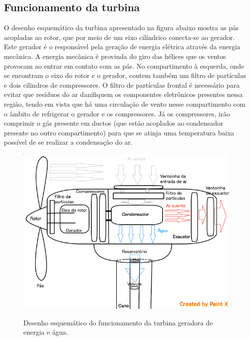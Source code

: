 \subsection{Funcionamento da turbina}
  
  O desenho esquemático da turbina apresentado na figura abaixo mostra as pás acopladas ao rotor, que por meio de um eixo cilíndrico conecta-se ao gerador. Este gerador é o responsável pela geração de energia elétrica através da energia mecânica. A energia mecânica é provinda do giro das hélices que os ventos provocam ao entrar em contato com as pás.  No compartimento à esquerda, onde se encontram o eixo do rotor e o gerador, contem também um filtro de partículas e dois cilindros de compressores. O filtro de partículas frontal é necessário para evitar que resíduos do ar danifiquem os componentes eletrônicos presentes nessa região, tendo em vista que há uma circulação de vento nesse compartimento com o âmbito de refrigerar o gerador e os compressores. Já os compressores, irão comprimir o gás presente em ductos (que estão acoplados ao condensador presente no outro compartimento) para que se atinja uma temperatura baixa possível de se realizar a condensação do ar.
  
  \FloatBarrier
  \begin{figure}[!h]
    \centering
    \includegraphics[scale = 0.9]{editaveis/figuras/funcionamento_turbina}
    \label{funcionamento_turbina}
    \caption[Funcionamento da turbina]{Desenho esquemático do funcionamento da turbina geradora de energia e água.}
  \end{figure}
  \FloatBarrier
    
